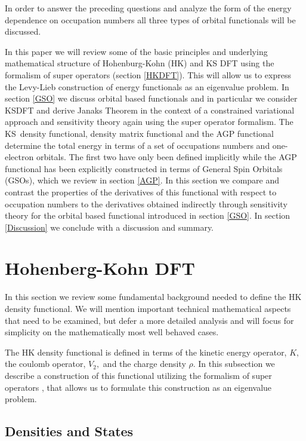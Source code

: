 \documentclass[aps,preprint]{revtex4}%
\begin{document}
In order to answer the preceding questions and analyze the form of the energy
dependence on occupation numbers all three types of orbital functionals will
be discussed.

In this paper we will review some of the basic principles and underlying
mathematical structure of Hohenburg-Kohn (HK) \cite{HK1964} and KS DFT using
the formalism of super operators \cite{Lowdin1982} (section \ref{HKDFT}). This
will allow us to express the Levy-Lieb construction of energy functionals as
an eigenvalue problem. In section \ref{GSO} we discuss orbital based
functionals and in particular we consider KSDFT and derive Janaks Theorem in
the context of a constrained variational approach and sensitivity theory again
using the super operator formalism. The KS\ density functional, density matrix
functional and the AGP functional determine the total energy in terms of a set
of occupations numbers and one-electron orbitals. The first two have only been
defined implicitly while the AGP functional has been explicitly constructed
\cite{OrtizWeiner2006} in terms of General Spin Orbitals (GSOs), which we
review in section \ref{AGP}. In this section we compare and contrast the
properties of the derivatives of this functional with respect to occupation
numbers to the derivatives obtained indirectly through sensitivity theory for
the orbital based functional introduced in section \ref{GSO}. In section
\ref{Discussion} we conclude with a discussion and summary.

\section{Hohenberg-Kohn DFT\label{HKDFT}}

In this section we review some fundamental background needed to define the HK
density functional. We will mention important technical mathematical aspects
that need to be examined, but defer a more detailed analysis and will focus
for simplicity on the mathematically most well behaved cases.

The HK density functional is defined in terms of the kinetic energy operator,
$K,$ the coulomb operator, $V_{2},$ and the charge density $\rho$. In this
subsection we describe a construction of this functional utilizing the
formalism of super operators \cite{Lowdin1982}, that allows us to formulate
this construction as an eigenvalue problem.

\subsection{Densities and States\label{DenStat}}
\end{document}
